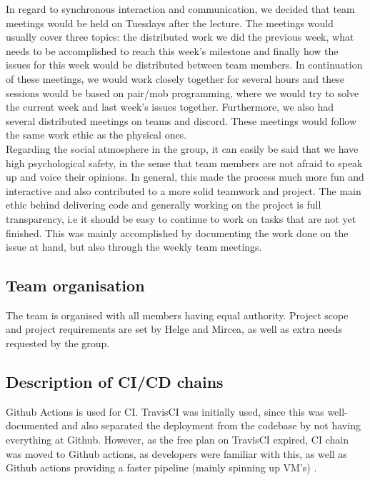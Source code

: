 In regard to synchronous interaction and communication, we decided that team meetings would be held on Tuesdays after the lecture. The meetings would usually cover three topics: the distributed work we did the previous week, what needs to be accomplished to reach this week's milestone and finally how the issues for this week would be distributed between team members. In continuation of these meetings, we would work closely together for several hours and these sessions would be based on pair/mob programming, where we would try to solve the current week and last week's issues together. Furthermore, we also had several distributed meetings on teams and discord. These meetings would follow the same work ethic as the physical ones.\\

Regarding the social atmosphere in the group, it can easily be said that we have high psychological safety, in the sense that team members are not afraid to speak up and voice their opinions. In general, this made the process much more fun and interactive and also contributed to a more solid teamwork and project. The main ethic behind delivering code and generally working on the project is full transparency, i.e it should be easy to continue to work on tasks that are not yet finished. This was mainly accomplished by documenting the work done on the issue at hand, but also through the weekly team meetings.

\subsection{Team organisation}
The team is organised with all members having equal authority. Project scope and project requirements are set by Helge and Mircea, as well as extra needs requested by the group. 

\subsection{Description of CI/CD chains}
Github Actions is used for CI. TravisCI was initially used, since this was well-documented and also separated the deployment from the codebase by not having everything at Github\cite{issue58}. However, as the free plan on TravisCI expired, CI chain was moved to Github actions, as developers were familiar with this, as well as Github actions providing a faster pipeline (mainly spinning up VM's) \cite{issue117}.\\

